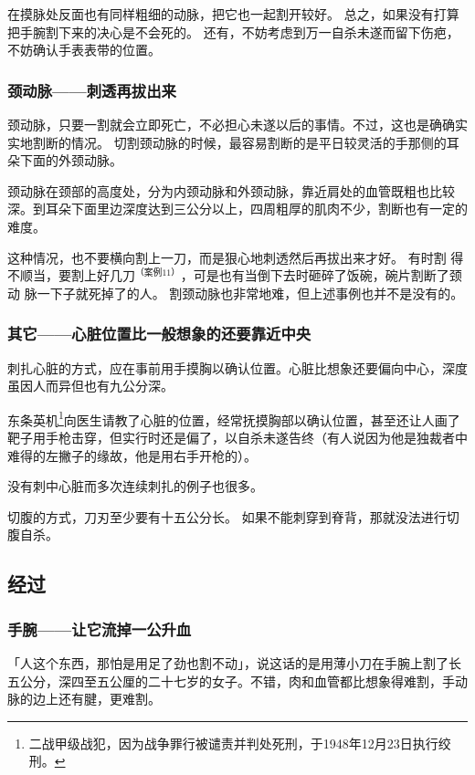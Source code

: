 \documentclass[UTF8]{ctexart}
\begin{document}
在摸脉处反面也有同样粗细的动脉，把它也一起割开较好。
总之，如果没有打算把手腕割下来的决心是不会死的。 
还有，不妨考虑到万一自杀未遂而留下伤疤，不妨确认手表表带的位置。

\subsubsection*{颈动脉——刺透再拔出来}

颈动脉，只要一割就会立即死亡，不必担心未遂以后的事情。不过，这也是确确实实地割断的情况。
切割颈动脉的时候，最容易割断的是平日较灵活的手那侧的耳朵下面的外颈动脉。

颈动脉在颈部的高度处，分为内颈动脉和外颈动脉，靠近肩处的血管既粗也比较深。到耳朵下面里边深度达到三公分以上，四周粗厚的肌肉不少，割断也有一定的难度。

这种情况，也不要横向割上一刀，而是狠心地刺透然后再拔出来才好。
有时割 得不顺当，要割上好几刀$^{（案例11）}$，可是也有当倒下去时砸碎了饭碗，碗片割断了颈动 脉一下子就死掉了的人。
割颈动脉也非常地难，但上述事例也并不是没有的。

\subsubsection*{其它——心脏位置比一般想象的还要靠近中央}

刺扎心脏的方式，应在事前用手摸胸以确认位置。心脏比想象还要偏向中心，深度虽因人而异但也有九公分深。

东条英机\footnote{二战甲级战犯，因为战争罪行被谴责并判处死刑，于1948年12月23日执行绞刑。}向医生请教了心脏的位置，经常抚摸胸部以确认位置，甚至还让人画了靶子用手枪击穿，但实行时还是偏了，以自杀未遂告终（有人说因为他是独裁者中难得的左撇子的缘故，他是用右手开枪的）。

没有刺中心脏而多次连续刺扎的例子也很多。

切腹的方式，刀刃至少要有十五公分长。
如果不能刺穿到脊背，那就没法进行切腹自杀。

\subsection{经过}

\subsubsection*{手腕——让它流掉一公升血}

「人这个东西，那怕是用足了劲也割不动」，说这话的是用薄小刀在手腕上割了长五公分，深四至五公厘的二十七岁的女子。不错，肉和血管都比想象得难割，手动脉的边上还有腱，更难割。
\end{document}
